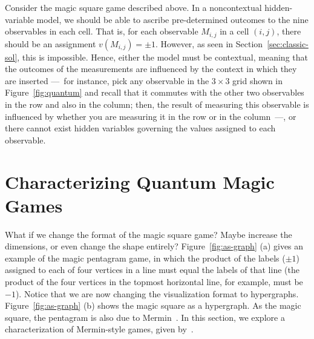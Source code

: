 \documentclass{llncs}
\begin{document}
Consider the magic square game described above. In a noncontextual
hidden-variable model, we should be able to ascribe pre-determined
outcomes to the nine observables in each cell. That is, for each
observable \(M_{i, j}\) in a cell \((i, j)\), there should be an
assignment \(v(M_{i, j}) = \pm{}1\). However, as seen in
Section~\ref{sec:classic-sol}, this is impossible. Hence, either the
model must be contextual, meaning that the outcomes of the
measurements are influenced by the context in which they are inserted
---~for instance, pick any observable in the \(3 \times 3\) grid shown
in Figure~\ref{fig:quantum} and recall that it commutes with the other
two observables in the row and also in the column; then, the result of
measuring this observable is influenced by whether you are measuring
it in the row or in the column~---, or there cannot exist hidden
variables governing the values assigned to each observable.

\section{Characterizing Quantum Magic Games}
\label{sec:extending}
What if we change the format of the magic square game?  Maybe increase
the dimensions, or even change the shape entirely?
Figure~\ref{fig:as-graph} (a) gives an example of the magic pentagram
game, in which the product of the labels (\(\pm{}1\)) assigned to each
of four vertices in a line must equal the labels of that line (the
product of the four vertices in the topmost horizontal line, for
example, must be \(-1\)). Notice that we are now changing the
visualization format to hypergraphs.  Figure~\ref{fig:as-graph} (b)
shows the magic square as a hypergraph.  As the magic square, the
pentagram is also due to Mermin~\cite{mermin:1993}.  In this section,
we explore a characterization of Mermin-style games, given
by~\cite{arkhipov:2012}.
\end{document}
